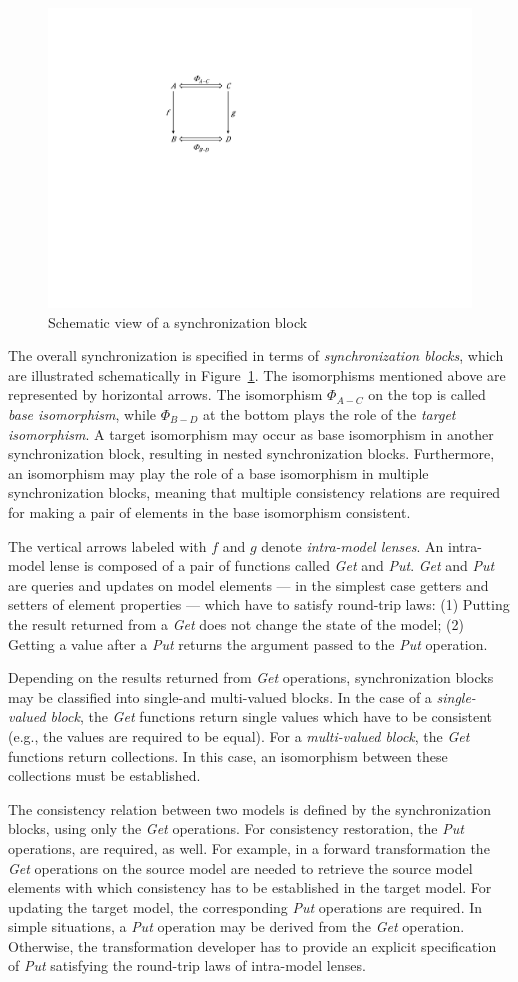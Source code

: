 \begin{figure}[tb!]
	\centering
	\includegraphics[width=0.35\columnwidth]{diagrams/solutions/NMFSynchronizationBlock}
	\caption{Schematic view of a synchronization block}
	\label{fig:SynchronizationBlock}
\end{figure}

The overall synchronization is specified in terms of \emph{synchronization blocks}, which are illustrated schematically in Figure~\ref{fig:SynchronizationBlock}. The isomorphisms mentioned above are represented by horizontal arrows. The isomorphism $\varPhi_{A-C}$ on the top is called \emph{base isomorphism}, while $\varPhi_{B-D}$ at the bottom plays the role of the \emph{target isomorphism}. A target isomorphism may occur as base isomorphism in another synchronization block, resulting in nested synchronization blocks. Furthermore, an isomorphism may play the role of a base isomorphism in multiple synchronization blocks, meaning that multiple consistency relations are required for making a pair of elements in the base isomorphism consistent.

The vertical arrows labeled with $f$ and $g$ denote \emph{intra-model lenses}. An intra-model lense is composed of a pair of functions called \emph{Get} and \emph{Put}. \emph{Get} and \emph{Put} are queries and updates on model elements --- in the simplest case getters and setters of element properties --- which have to satisfy round-trip laws: (1) Putting the result returned from a \emph{Get} does not change the state of the model; (2) Getting a value after a \emph{Put} returns the argument passed to the \emph{Put} operation.

Depending on the results returned from \emph{Get} operations, synchronization blocks may be classified into single-and multi-valued blocks. In the case of a \emph{single-valued block}, the \emph{Get} functions return single values which have to be consistent (e.g., the values are required to be equal). For a \emph{multi-valued block}, the \emph{Get} functions return collections. In this case, an isomorphism between these collections must be established.

The consistency relation between two models is defined by the synchronization blocks, using only the \emph{Get} operations. For consistency restoration, the \emph{Put} operations, are required, as well. For example, in a forward transformation the \emph{Get} operations on the source model are needed to retrieve the source model elements with which consistency has to be established in the target model. For updating the target model, the corresponding \emph{Put} operations are required. In simple situations, a \emph{Put} operation may be derived from the \emph{Get} operation. Otherwise, the transformation developer has to provide an explicit specification of \emph{Put} satisfying the round-trip laws of intra-model lenses. 

